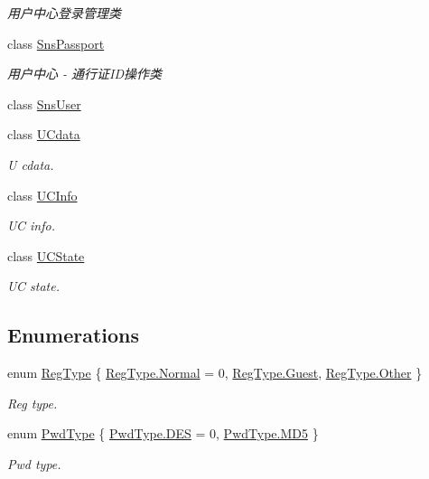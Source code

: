 \begin{DoxyCompactItemize}
\begin{DoxyCompactList}\small\item\em 用户中心登录管理类 \end{DoxyCompactList}\item 
class \mbox{\hyperlink{class_t_net_1_1_sns_1_1_sns_passport}{Sns\+Passport}}
\begin{DoxyCompactList}\small\item\em 用户中心 -\/ 通行证\+I\+D操作类 \end{DoxyCompactList}\item 
class \mbox{\hyperlink{class_t_net_1_1_sns_1_1_sns_user}{Sns\+User}}
\item 
class \mbox{\hyperlink{class_t_net_1_1_sns_1_1_u_cdata}{U\+Cdata}}
\begin{DoxyCompactList}\small\item\em U cdata. \end{DoxyCompactList}\item 
class \mbox{\hyperlink{class_t_net_1_1_sns_1_1_u_c_info}{U\+C\+Info}}
\begin{DoxyCompactList}\small\item\em UC info. \end{DoxyCompactList}\item 
class \mbox{\hyperlink{class_t_net_1_1_sns_1_1_u_c_state}{U\+C\+State}}
\begin{DoxyCompactList}\small\item\em UC state. \end{DoxyCompactList}\end{DoxyCompactItemize}
\subsection*{Enumerations}
\begin{DoxyCompactItemize}
\item 
enum \mbox{\hyperlink{namespace_t_net_1_1_sns_a338402ea3c5dbc36f95f0a7e4c1cd3a2}{Reg\+Type}} \{ \mbox{\hyperlink{namespace_t_net_1_1_sns_a338402ea3c5dbc36f95f0a7e4c1cd3a2a960b44c579bc2f6818d2daaf9e4c16f0}{Reg\+Type.\+Normal}} = 0, 
\mbox{\hyperlink{namespace_t_net_1_1_sns_a338402ea3c5dbc36f95f0a7e4c1cd3a2aadb831a7fdd83dd1e2a309ce7591dff8}{Reg\+Type.\+Guest}}, 
\mbox{\hyperlink{namespace_t_net_1_1_sns_a338402ea3c5dbc36f95f0a7e4c1cd3a2a6311ae17c1ee52b36e68aaf4ad066387}{Reg\+Type.\+Other}}
 \}
\begin{DoxyCompactList}\small\item\em Reg type. \end{DoxyCompactList}\item 
enum \mbox{\hyperlink{namespace_t_net_1_1_sns_a9176c2d4c1f71e42244386252d163f70}{Pwd\+Type}} \{ \mbox{\hyperlink{namespace_t_net_1_1_sns_a9176c2d4c1f71e42244386252d163f70a80ac4ad5ef5d93178348c18272df6bd3}{Pwd\+Type.\+D\+ES}} = 0, 
\mbox{\hyperlink{namespace_t_net_1_1_sns_a9176c2d4c1f71e42244386252d163f70a7f138a09169b250e9dcb378140907378}{Pwd\+Type.\+M\+D5}}
 \}
\begin{DoxyCompactList}\small\item\em Pwd type. \end{DoxyCompactList}\end{DoxyCompactItemize}


